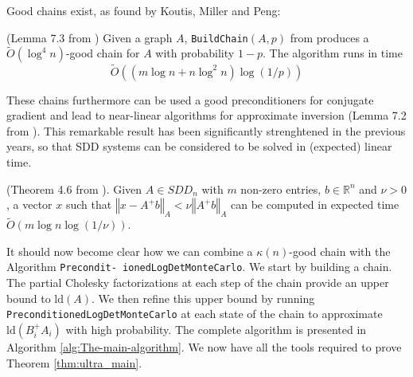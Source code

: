 Good chains exist, as found by Koutis, Miller and Peng:

\begin{lemma} \label{lem:good-chain} (Lemma 7.3 from \cite{Koutis2010})
Given a graph $A$, \texttt{BuildChain}$\left(A,p\right)$ from \cite{Koutis2010}
produces a $\tilde{O}\left(\log^{4}n\right)$-good chain for $A$
with probability $1-p$. The algorithm runs in time 
\[
\tilde{O}\left(\left(m\log n+n\log^{2}n\right)\log\left(1/p\right)\right)
\]


\end{lemma}

These chains furthermore can be used a good preconditioners for conjugate
gradient and lead to near-linear algorithms for approximate inversion
(Lemma 7.2 from \cite{Koutis2010}). This remarkable result has been
significantly strenghtened in the previous years, so that SDD systems
can be considered to be solved in (expected) linear time.

\begin{lemma} \label{lem:linear-precond-existence}(Theorem 4.6 from
\cite{Koutis2011}). Given $A\in SDD_{n}$ with $m$ non-zero entries,
$b\in\mathbb{R}^{n}$ and $\nu>0$, a vector $x$ such that $\left\Vert x-A^{+}b\right\Vert _{A}<\nu\left\Vert A^{+}b\right\Vert _{A}$
can be computed in expected time $\tilde{O}\left(m\log n\log\left(1/\nu\right)\right)$.\end{lemma}

It should now become clear how we can combine a $\kappa\left(n\right)$-good
chain with the Algorithm \texttt{Precondit- ionedLogDetMonteCarlo}.
We start by building a chain. The partial Cholesky factorizations
at each step of the chain provide an upper bound to $\mbox{ld}\left(A\right)$.
We then refine this upper bound by running \texttt{PreconditionedLogDetMonteCarlo}
at each state of the chain to approximate $\mbox{ld}\left(B_{i}^{+}A_{i}\right)$
with high probability. The complete algorithm is presented in Algorithm
\ref{alg:The-main-algorithm}. We now have all the tools required
to prove Theorem \ref{thm:ultra_main}.

